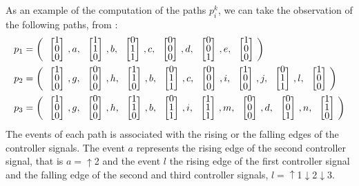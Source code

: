 \setlength\arraycolsep{2pt}
As an example of the computation of the paths $p_i^k$, we can take the observation of the following
paths, from \cite{moreira2018enhanced}:
\begin{align*}
  p_1&= \left(\colvec{1\\0\\0},a,\colvec{1\\1\\0},b,\colvec{0\\1\\1},c,\colvec{0\\0\\0},d,\colvec{0\\0\\1},e,\colvec{1\\0\\0}\right) \\
  p_2&= \left(\colvec{1\\0\\0},g,\colvec{0\\0\\0},h,\colvec{1\\1\\0},b,\colvec{0\\1\\1},c,\colvec{0\\0\\0},i,\colvec{1\\0\\0},j,\colvec{0\\1\\1},l,\colvec{1\\0\\0}\right) \\
  p_3&= \left(\colvec{1\\0\\0},g,\colvec{0\\0\\0},h,\colvec{1\\1\\0},b,\colvec{0\\1\\1},i,\colvec{1\\1\\1},m,\colvec{0\\0\\0},d,\colvec{0\\0\\1},n,\colvec{1\\1\\0}\right) \\
\end{align*}
The events of each path is associated with the rising or the falling edges of
the controller signals. The event $a$ represents the rising edge of the second
controller signal, that is $a=\uparrow$2 and the event $l$ the rising edge of the first
controller signal and the falling edge of the second
and third controller signals, $l=\uparrow$1$\downarrow$2$\downarrow$3.

